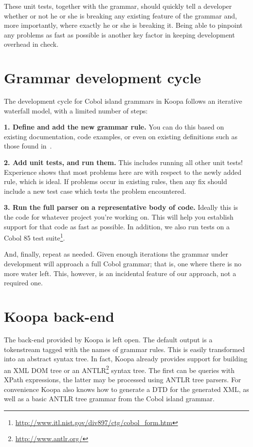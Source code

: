 \documentclass[a4paper]{article}
\begin{document}
These unit tests, together with the grammar, should quickly tell a developer whether or not he or she is breaking any existing feature of the grammar and, more importantly, where exactly he or she is breaking it. Being able to pinpoint any problems as fast as possible is another key factor in keeping development overhead in check.


\section{Grammar development cycle}
\label{development-cycle}

The development cycle for Cobol island grammars in Koopa follows an iterative waterfall model, with a limited number of steps:

\textbf{1. Define and add the new grammar rule.} You can do this based on existing documentation, code examples, or even on existing definitions such as those found in~\cite{LV01-SPE}.

\textbf{2. Add unit tests, and run them.} This includes running all other unit tests! Experience shows that most problems here are with respect to the newly added rule, which is ideal. If problems occur in existing rules, then any fix should include a new test case which tests the problem encountered.

\textbf{3. Run the full parser on a representative body of code.} Ideally this is the code for whatever project you're working on. This will help you establish support for that code as fast as possible. In addition, we also run tests on a Cobol 85 test suite\footnote{\scriptsize\url{http://www.itl.nist.gov/div897/ctg/cobol_form.htm}}.

And, finally, repeat as needed. Given enough iterations the grammar under development will approach a full Cobol grammar; that is, one where there is no more water left. This, however, is an incidental feature of our approach, not a required one.


\section{Koopa back-end}
\label{backend}

The back-end provided by Koopa is left open. The default output is a tokenstream tagged with the names of grammar rules. This is easily transformed into an abstract syntax tree. In fact, Koopa already provides support for building an XML DOM tree or an ANTLR\footnote{\scriptsize\url{http://www.antlr.org/}} syntax tree. The first can be queries with XPath expressions, the latter may be processed using ANTLR tree parsers. For convenience Koopa also knows how to generate a DTD for the generated XML, as well as a basic ANTLR tree grammar from the Cobol island grammar.
\end{document}
